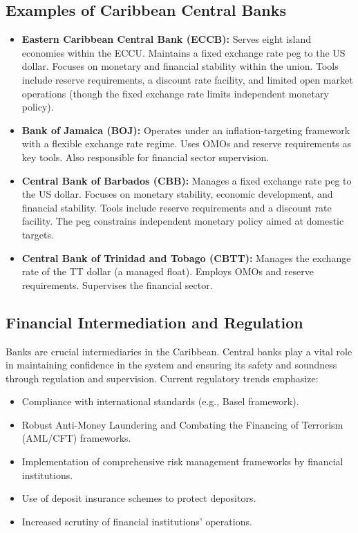 \subsection{Examples of Caribbean Central Banks}
\begin{itemize}
    \item \textbf{Eastern Caribbean Central Bank (ECCB):} Serves eight island economies within the ECCU. Maintains a fixed exchange rate peg to the US dollar. Focuses on monetary and financial stability within the union. Tools include reserve requirements, a discount rate facility, and limited open market operations (though the fixed exchange rate limits independent monetary policy).
    \item \textbf{Bank of Jamaica (BOJ):} Operates under an inflation-targeting framework with a flexible exchange rate regime. Uses OMOs and reserve requirements as key tools. Also responsible for financial sector supervision.
    \item \textbf{Central Bank of Barbados (CBB):} Manages a fixed exchange rate peg to the US dollar. Focuses on monetary stability, economic development, and financial stability. Tools include reserve requirements and a discount rate facility. The peg constrains independent monetary policy aimed at domestic targets.
    \item \textbf{Central Bank of Trinidad and Tobago (CBTT):} Manages the exchange rate of the TT dollar (a managed float). Employs OMOs and reserve requirements. Supervises the financial sector.
\end{itemize}

\subsection{Financial Intermediation and Regulation}
Banks are crucial intermediaries in the Caribbean. Central banks play a vital role in maintaining confidence in the system and ensuring its safety and soundness through regulation and supervision. Current regulatory trends emphasize:
\begin{itemize}
    \item Compliance with international standards (e.g., Basel framework).
    \item Robust Anti-Money Laundering and Combating the Financing of Terrorism (AML/CFT) frameworks.
    \item Implementation of comprehensive risk management frameworks by financial institutions.
    \item Use of deposit insurance schemes to protect depositors.
    \item Increased scrutiny of financial institutions' operations.
\end{itemize}

